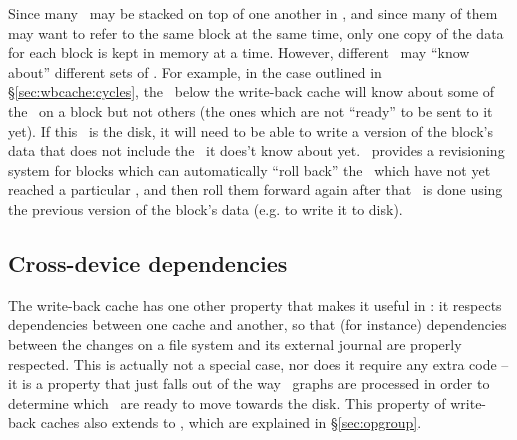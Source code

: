 Since many \modules\ may be stacked on top of one another in \Kudos, and since
many of them may want to refer to the same block at the same time, only one copy
of the data for each block is kept in memory at a time. However, different
\modules\ may ``know about'' different sets of \chdescs. For example, in the
case outlined in \S\ref{sec:wbcache:cycles}, the \module\ below the write-back
cache will know about some of the \chdescs\ on a block but not others (the ones
which are not ``ready'' to be sent to it yet). If this \module\ is the disk, it
will need to be able to write a version of the block's data that does not
include the \chdescs\ it does't know about yet. \Kudos\ provides a revisioning
system for blocks which can automatically ``roll back'' the \chdescs\ which have
not yet reached a particular \module, and then roll them forward again after
that \module\ is done using the previous version of the block's data (e.g. to
write it to disk).

\subsection{Cross-device dependencies}

The write-back cache has one other property that makes it useful in \Kudos: it
respects dependencies between one cache and another, so that (for instance)
dependencies between the changes on a file system and its external journal are
properly respected. This is actually not a special case, nor does it require any
extra code -- it is a property that just falls out of the way \chdesc\ graphs
are processed in order to determine which \chdescs\ are ready to move towards
the disk. This property of write-back caches also extends to \opgroups, which
are explained in \S\ref{sec:opgroup}.

